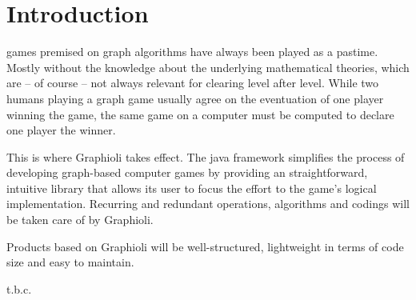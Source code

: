 \section{Introduction}
\Glspl{game} premised on \gls{graph} \glspl{algorithm} have always been played as a pastime. Mostly without the knowledge about the underlying mathematical theories, which are – of course – not always relevant for clearing \gls{level} after level. While two humans playing a graph game usually agree on the eventuation of one player winning the game, the same game on a computer must be computed to declare one \gls{player} the winner.\par

This is where Graphioli takes effect. The \Gls{java} \gls{framework} simplifies the process of developing graph-based computer games by providing an straightforward, intuitive \gls{library} that allows its user to focus the effort to the game's logical implementation. Recurring and redundant operations, algorithms and codings will be taken care of by Graphioli.\par

Products based on Graphioli will be well-structured, lightweight in terms of code size and easy to maintain.\par

t.b.c.